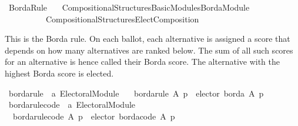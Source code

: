 %
\begin{isabellebody}%
%
%
\isadelimdocument
\isanewline
%
\endisadelimdocument
%
\isatagdocument
\isanewline
%
\isamarkuptrue%
%
\isamarkuptrue%
%
\endisatagdocument
{\isafolddocument}%
%
\isadelimdocument
%
\endisadelimdocument
%
\isadelimtheory
%
\endisadelimtheory
%
\isatagtheory
{}\isamarkupfalse%
\ Borda{\isacharunderscore}{\kern0pt}Rule\isanewline
\ \ \ {\isachardoublequoteopen}Compositional{\isacharunderscore}{\kern0pt}Structures{\isacharslash}{\kern0pt}Basic{\isacharunderscore}{\kern0pt}Modules{\isacharslash}{\kern0pt}Borda{\isacharunderscore}{\kern0pt}Module{\isachardoublequoteclose}\isanewline
\ \ \ \ \ \ \ \ \ \ {\isachardoublequoteopen}Compositional{\isacharunderscore}{\kern0pt}Structures{\isacharslash}{\kern0pt}Elect{\isacharunderscore}{\kern0pt}Composition{\isachardoublequoteclose}\isanewline
{}%
\endisatagtheory
{\isafoldtheory}%
%
\isadelimtheory
%
\endisadelimtheory
%
\begin{isamarkuptext}%
This is the Borda rule. On each ballot, each alternative is assigned a score
that depends on how many alternatives are ranked below. The sum of all such
scores for an alternative is hence called their Borda score. The alternative
with the highest Borda score is elected.%
\end{isamarkuptext}\isamarkuptrue%
%
\isadelimdocument
%
\endisadelimdocument
%
\isatagdocument
%
\isamarkuptrue%
%
\endisatagdocument
{\isafolddocument}%
%
\isadelimdocument
%
\endisadelimdocument
{}\isamarkupfalse%
\ borda{\isacharunderscore}{\kern0pt}rule\ {\isacharcolon}{\kern0pt}{\isacharcolon}{\kern0pt}\ {\isachardoublequoteopen}{\isacharprime}{\kern0pt}a\ Electoral{\isacharunderscore}{\kern0pt}Module{\isachardoublequoteclose}\ \isanewline
\ \ {\isachardoublequoteopen}borda{\isacharunderscore}{\kern0pt}rule\ A\ p\ {\isacharequal}{\kern0pt}\ elector\ borda\ A\ p{\isachardoublequoteclose}\isanewline
\isanewline
{}\isamarkupfalse%
\ borda{\isacharunderscore}{\kern0pt}rule{\isacharunderscore}{\kern0pt}code\ {\isacharcolon}{\kern0pt}{\isacharcolon}{\kern0pt}\ {\isachardoublequoteopen}{\isacharprime}{\kern0pt}a\ Electoral{\isacharunderscore}{\kern0pt}Module{\isachardoublequoteclose}\ \isanewline
\ \ {\isachardoublequoteopen}borda{\isacharunderscore}{\kern0pt}rule{\isacharunderscore}{\kern0pt}code\ A\ p\ {\isacharequal}{\kern0pt}\ elector\ borda{\isacharunderscore}{\kern0pt}code\ A\ p{\isachardoublequoteclose}\isanewline
%
\isadelimtheory
\isanewline
%
\endisadelimtheory
%
\isatagtheory
{}\isamarkupfalse%
%
\endisatagtheory
{\isafoldtheory}%
%
\isadelimtheory
%
\endisadelimtheory
%
\end{isabellebody}%
\endinput

